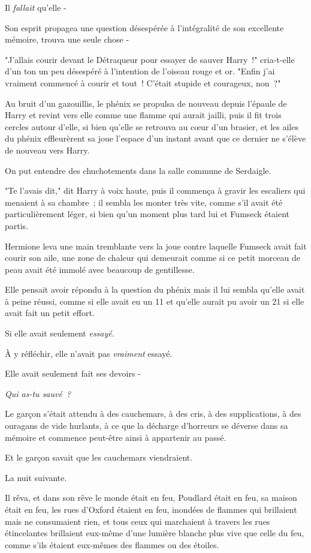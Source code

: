 Il \emph{fallait} qu'elle -

Son esprit propagea une question désespérée à l'intégralité de son excellente mémoire, trouva une seule chose -

"J'allais courir devant le Détraqueur pour essayer de sauver Harry~!" cria-t-elle d'un ton un peu désespéré à l'intention de l'oiseau rouge et or. "Enfin j'ai vraiment commencé à courir et tout~! C'était stupide et courageux, non~?"

Au bruit d'un gazouillis, le phénix se propulsa de nouveau depuis l'épaule de Harry et revint vers elle comme une flamme qui aurait jailli, puis il fit trois cercles autour d'elle, si bien qu'elle se retrouva au cœur d'un brasier, et les ailes du phénix effleurèrent sa joue l'espace d'un instant avant que ce dernier ne s'élève de nouveau vers Harry.

On put entendre des chuchotements dans la salle commune de Serdaigle.

"Te l'avais dit," dit Harry à voix haute, puis il commença à gravir les escaliers qui menaient à sa chambre~; il sembla les monter très vite, comme s'il avait été particulièrement léger, si bien qu'un moment plus tard lui et Fumseck étaient partis.

Hermione leva une main tremblante vers la joue contre laquelle Fumseck avait fait courir son aile, une zone de chaleur qui demeurait comme si ce petit morceau de peau avait été immolé avec beaucoup de gentillesse.

Elle pensait avoir répondu à la question du phénix mais il lui sembla qu'elle avait à peine réussi, comme si elle avait eu un 11 et qu'elle aurait pu avoir un 21 si elle avait fait un petit effort.

Si elle avait seulement \emph{essayé}.

À y réfléchir, elle n'avait pas \emph{vraiment} essayé.

Elle avait seulement fait ses devoirs -

\emph{Qui as-tu sauvé~?}


Le garçon s'était attendu à des cauchemars, à des cris, à des supplications, à des ouragans de vide hurlants, à ce que la décharge d'horreurs se déverse dans sa mémoire et commence peut-être ainsi à appartenir au passé.

Et le garçon savait que les cauchemars viendraient.

La nuit suivante.

Il rêva, et dans son rêve le monde était en feu, Poudlard était en feu, sa maison était en feu, les rues d'Oxford étaient en feu, inondées de flammes qui brillaient mais ne consumaient rien, et tous ceux qui marchaient à travers les rues étincelantes brillaient eux-même d'une lumière blanche plus vive que celle du feu, comme s'ils étaient eux-mêmes des flammes ou des étoiles.

